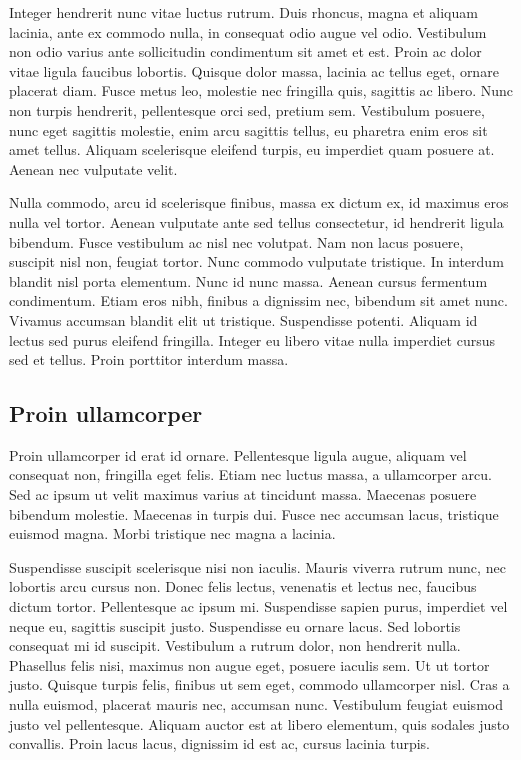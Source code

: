 \documentclass[twoside,openright,a4paper,11pt,french]{article}
\begin{document}
Integer hendrerit nunc vitae luctus rutrum. Duis rhoncus, magna et aliquam lacinia, ante ex commodo nulla, in consequat odio augue vel odio. Vestibulum non odio varius ante sollicitudin condimentum sit amet et est. Proin ac dolor vitae ligula faucibus lobortis. Quisque dolor massa, lacinia ac tellus eget, ornare placerat diam. Fusce metus leo, molestie nec fringilla quis, sagittis ac libero. Nunc non turpis hendrerit, pellentesque orci sed, pretium sem. Vestibulum posuere, nunc eget sagittis molestie, enim arcu sagittis tellus, eu pharetra enim eros sit amet tellus. Aliquam scelerisque eleifend turpis, eu imperdiet quam posuere at. Aenean nec vulputate velit.

Nulla commodo, arcu id scelerisque finibus, massa ex dictum ex, id maximus eros nulla vel tortor. Aenean vulputate ante sed tellus consectetur, id hendrerit ligula bibendum. Fusce vestibulum ac nisl nec volutpat. Nam non lacus posuere, suscipit nisl non, feugiat tortor. Nunc commodo vulputate tristique. In interdum blandit nisl porta elementum. Nunc id nunc massa. Aenean cursus fermentum condimentum. Etiam eros nibh, finibus a dignissim nec, bibendum sit amet nunc. Vivamus accumsan blandit elit ut tristique. Suspendisse potenti. Aliquam id lectus sed purus eleifend fringilla. Integer eu libero vitae nulla imperdiet cursus sed et tellus. Proin porttitor interdum massa.

\subsection{Proin ullamcorper}

Proin ullamcorper id erat id ornare. Pellentesque ligula augue, aliquam vel consequat non, fringilla eget felis. Etiam nec luctus massa, a ullamcorper arcu. Sed ac ipsum ut velit maximus varius at tincidunt massa. Maecenas posuere bibendum molestie. Maecenas in turpis dui. Fusce nec accumsan lacus, tristique euismod magna. Morbi tristique nec magna a lacinia.

Suspendisse suscipit scelerisque nisi non iaculis. Mauris viverra rutrum nunc, nec lobortis arcu cursus non. Donec felis lectus, venenatis et lectus nec, faucibus dictum tortor. Pellentesque ac ipsum mi. Suspendisse sapien purus, imperdiet vel neque eu, sagittis suscipit justo. Suspendisse eu ornare lacus. Sed lobortis consequat mi id suscipit. Vestibulum a rutrum dolor, non hendrerit nulla. Phasellus felis nisi, maximus non augue eget, posuere iaculis sem. Ut ut tortor justo. Quisque turpis felis, finibus ut sem eget, commodo ullamcorper nisl. Cras a nulla euismod, placerat mauris nec, accumsan nunc. Vestibulum feugiat euismod justo vel pellentesque. Aliquam auctor est at libero elementum, quis sodales justo convallis. Proin lacus lacus, dignissim id est ac, cursus lacinia turpis.
\end{document}
